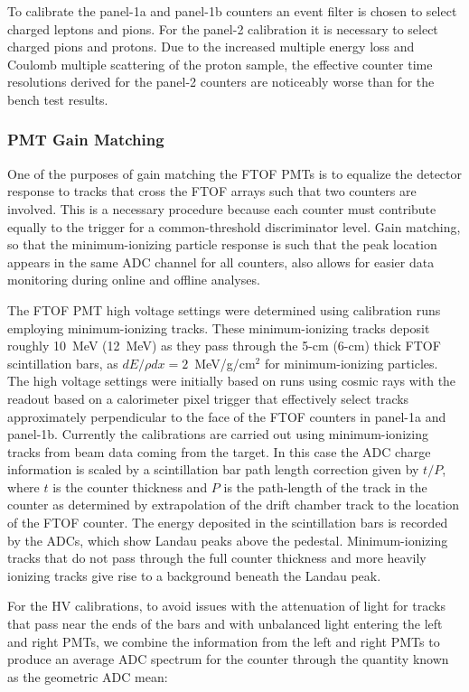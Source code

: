 \documentclass{elsart}
\begin{document}
To calibrate the panel-1a and panel-1b counters an event filter is chosen to select charged leptons and pions.
For the panel-2 calibration it is necessary to select charged pions and protons. Due to the increased multiple
energy loss and Coulomb multiple scattering of the proton sample, the effective counter time resolutions
derived for the panel-2 counters are noticeably worse than for the bench test results.

\subsubsection{PMT Gain Matching}
\label{gain-matching}

One of the purposes of gain matching the FTOF PMTs is to equalize the detector response to tracks that
cross the FTOF arrays such that two counters are involved. This is a necessary procedure because each
counter must contribute equally to the trigger for a common-threshold discriminator level. Gain matching,
so that the minimum-ionizing particle response is such that the peak location appears in the same ADC
channel for all counters, also allows for easier data monitoring during online and offline analyses.

The FTOF PMT high voltage settings were determined using calibration runs employing minimum-ionizing
tracks. These minimum-ionizing tracks deposit roughly 10~MeV (12~MeV) as they pass through the 5-cm
(6-cm) thick FTOF scintillation bars, as $dE/\rho dx = 2$~MeV/g/cm$^2$ for minimum-ionizing particles.
The high voltage settings were initially based on runs using cosmic rays with the readout based on a
calorimeter pixel trigger that effectively select tracks approximately perpendicular to the face of the
FTOF counters in panel-1a and panel-1b. Currently the calibrations are carried out using minimum-ionizing
tracks from beam data coming from the target. In this case the ADC charge information is scaled by a
scintillation bar path length correction given by $t/P$, where $t$ is the counter thickness and $P$ is the
path-length of the track in the counter as determined by extrapolation of the drift chamber track to the
location of the FTOF counter. The energy deposited in the scintillation bars is recorded by the ADCs, which
show Landau peaks above the pedestal. Minimum-ionizing tracks that do not pass through the full counter
thickness and more heavily ionizing tracks give rise to a background beneath the Landau peak.

For the HV calibrations, to avoid issues with the attenuation of light for tracks that pass near the ends of
the bars and with unbalanced light entering the left and right PMTs, we combine the information from the
left and right PMTs to produce an average ADC spectrum for the counter through the quantity known
as the geometric ADC mean:
\end{document}
